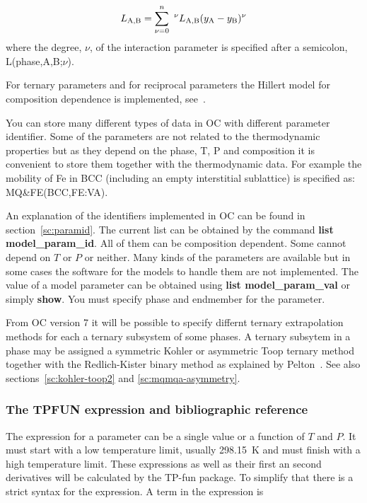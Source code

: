 \documentclass[11pt]{article}
\begin{document}
\begin{eqnarray*}
L_{\rm A,B} = \sum_{\nu=0}^n  ~^{\nu}L_{\rm A,B} (y_{\rm A} - y_{\rm B})^{\nu}
\end{eqnarray*}
where the degree, $\nu$, of the interaction parameter is specified
after a semicolon, L(phase,A,B;$\nu$).

For ternary parameters and for reciprocal parameters the Hillert model
for composition dependence is implemented, see~\cite{07Luk}.

You can store many different types of data in OC with different
parameter identifier.  Some of the parameters are not related to the
thermodynamic properties but as they depend on the phase, T, P and
composition it is convenient to store them together with the
thermodynamic data.  For example the mobility of Fe in BCC (including
an empty interstitial sublattice) is specified as: MQ\&FE(BCC,FE:VA).

An explanation of the identifiers implemented in OC can be found in
section~\ref{sc:paramid}.  The current list can be obtained by the
command {\bf list model\_param\_id}.  All of them can be composition
dependent.  Some cannot depend on $T$ or $P$ or neither.  Many kinds
of the parameters are available but in some cases the software for the
models to handle them are not implemented.  The value of a model
parameter can be obtained using {\bf list model\_param\_val} or simply
{\bf show}.  You must specify phase and endmember for the parameter.

From OC version 7 it will be possible to specify differnt ternary
extrapolation methods for each a ternary subsystem of some phases.  A
ternary subsytem in a phase may be assigned a symmetric Kohler or
asymmetric Toop ternary method together with the Redlich-Kister binary
method as explained by Pelton~\cite{01Pel}.  See also
sections~\ref{sc:kohler-toop2} and \ref{sc:mqmqa-asymmetry}.

\subsubsection{The TPFUN expression and bibliographic reference}\label{sc:tpfun}

The expression for a parameter can be a single value or a function of
$T$ and $P$.  It must start with a low temperature limit, usually
298.15~K and must finish with a high temperature limit.  These
expressions as well as their first an second derivatives will be
calculated by the TP-fun package.  To simplify that there is a strict
syntax for the expression.  A term in the expression is
\end{document}
